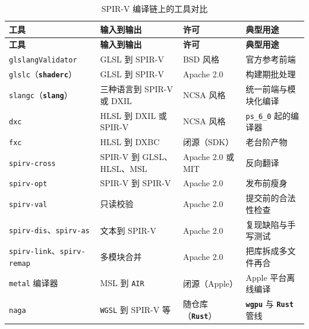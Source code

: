 \documentclass[12pt,a4paper,fontset=fandol]{ctexbook}
\newcommand{\Tp}[1]{\texttt{#1}}
\newcommand{\Bk}{\discretionary{}{}{}}
\newcommand{\Lib}[1]{\textbf{\texttt{#1}}}
\newcommand{\Lang}[1]{\textsf{#1}}
\newcommand{\GSL}{\Lang{GLSL}}
\newcommand{\HSL}{\Lang{HLSL}}
\newcommand{\MSL}{\Lang{MSL}}
\newcommand{\SPIV}{\Lang{SPIR-V}}
\begin{document}
\begin{longtable}{>{\raggedright\arraybackslash}p{}
                  >{\raggedright\arraybackslash}p{}
                  >{\raggedright\arraybackslash}p{}
                  >{\raggedright\arraybackslash}p{}}
\caption{\SPIV{} 编译链上的工具对比}\label{tab:ch07-tools} \\
\toprule
\textbf{工具} & \textbf{输入到输出} & \textbf{许可} & \textbf{典型用途} \\
\midrule
\endfirsthead
\toprule
\textbf{工具} & \textbf{输入到输出} & \textbf{许可} & \textbf{典型用途} \\
\midrule
\endhead
\midrule
\endfoot
\bottomrule
\endlastfoot
\Tp{glslang\Bk Validator} & \GSL{} 到 \SPIV{} & BSD 风格 & 官方参考前端 \\
\Tp{glslc}（\Lib{shaderc}） & \GSL{} 到 \SPIV{} & Apache 2.0 & 构建期批处理 \\
\Tp{slangc}（\Lib{slang}） & 三种语言到 \SPIV{} 或 DXIL & NCSA 风格 & 统一前端与模块化编译 \\
\Tp{dxc} & \HSL{} 到 DXIL 或 \SPIV{} & NCSA 风格 & \Tp{ps\_6\_0} 起的编译器 \\
\Tp{fxc} & \HSL{} 到 DXBC & 闭源（SDK） & 老台阶产物 \\
\Tp{spirv\Bk-cross} & \SPIV{} 到 \GSL{}、\HSL{}、\MSL{} & Apache 2.0 或 MIT & 反向翻译 \\
\Tp{spirv\Bk-opt} & \SPIV{} 到 \SPIV{} & Apache 2.0 & 发布前瘦身 \\
\Tp{spirv\Bk-val} & 只读校验 & Apache 2.0 & 提交前的合法性检查 \\
\Tp{spirv\Bk-dis}、\Tp{spirv\Bk-as} & 文本到 \SPIV{} & Apache 2.0 & 复现缺陷与手写测试 \\
\Tp{spirv\Bk-link}、\Tp{spirv\Bk-remap} & 多模块合并 & Apache 2.0 & 把库拆成多文件再合 \\
\Tp{metal} 编译器 & \MSL{} 到 \Tp{AIR} & 闭源（Apple） & Apple 平台离线编译 \\
\Tp{naga} & \Tp{WGSL} 到 \SPIV{} 等 & 随仓库（\Lib{Rust}） & \Lib{wgpu} 与 \Lib{Rust} 管线 \\
\end{longtable}
\end{document}
